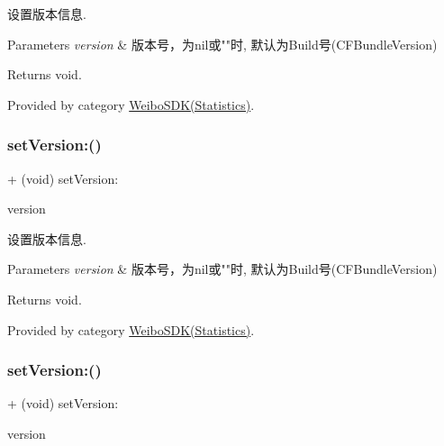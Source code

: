 设置版本信息. 
\begin{DoxyParams}{Parameters}
{\em version} & 版本号，为nil或""时, 默认为\+Build号(\+C\+F\+Bundle\+Version) \\
\hline
\end{DoxyParams}
\begin{DoxyReturn}{Returns}
void. 
\end{DoxyReturn}


Provided by category \mbox{\hyperlink{category_weibo_s_d_k_07_statistics_08_ac68e6c65a10fa6c5f04c1293050a7127}{Weibo\+S\+D\+K(\+Statistics)}}.

\mbox{\label{interface_weibo_s_d_k_ac68e6c65a10fa6c5f04c1293050a7127}} 
\subsubsection{\texorpdfstring{set\+Version\+:()}{setVersion:()}\hspace{0.1cm}{\footnotesize\ttfamily [2/3]}}
{\footnotesize\ttfamily + (void) set\+Version\+: \begin{DoxyParamCaption}\item[{(N\+S\+String $\ast$)}]{version }\end{DoxyParamCaption}}

设置版本信息. 
\begin{DoxyParams}{Parameters}
{\em version} & 版本号，为nil或""时, 默认为\+Build号(\+C\+F\+Bundle\+Version) \\
\hline
\end{DoxyParams}
\begin{DoxyReturn}{Returns}
void. 
\end{DoxyReturn}


Provided by category \mbox{\hyperlink{category_weibo_s_d_k_07_statistics_08_ac68e6c65a10fa6c5f04c1293050a7127}{Weibo\+S\+D\+K(\+Statistics)}}.

\mbox{\label{interface_weibo_s_d_k_ac68e6c65a10fa6c5f04c1293050a7127}} 
\subsubsection{\texorpdfstring{set\+Version\+:()}{setVersion:()}\hspace{0.1cm}{\footnotesize\ttfamily [3/3]}}
{\footnotesize\ttfamily + (void) set\+Version\+: \begin{DoxyParamCaption}\item[{(N\+S\+String $\ast$)}]{version }\end{DoxyParamCaption}}

